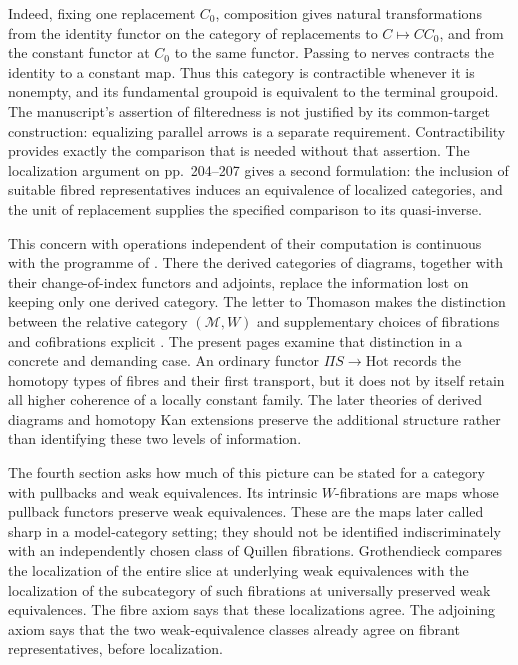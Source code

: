 Indeed, fixing one replacement $C_0$, composition gives natural transformations from the identity functor on the category of replacements to $C\mapsto C C_0$, and from the constant functor at $C_0$ to the same functor. Passing to nerves contracts the identity to a constant map. Thus this category is contractible whenever it is nonempty, and its fundamental groupoid is equivalent to the terminal groupoid. The manuscript's assertion of filteredness is not justified by its common-target construction: equalizing parallel arrows is a separate requirement. Contractibility provides exactly the comparison that is needed without that assertion. The localization argument on pp.~204--207 gives a second formulation: the inclusion of suitable fibred representatives induces an equivalence of localized categories, and the unit of replacement supplies the specified comparison to its quasi-inverse.

This concern with operations independent of their computation is continuous with the programme of \citet[\S69, printed pp.~1--3]{Grothendieck1983}. There the derived categories of diagrams, together with their change-of-index functors and adjoints, replace the information lost on keeping only one derived category. The letter to Thomason makes the distinction between the relative category $(\mathcal M,W)$ and supplementary choices of fibrations and cofibrations explicit \citep[points~1--2]{Grothendieck1991Letter}. The present pages examine that distinction in a concrete and demanding case. An ordinary functor $\Pi S\to\mathrm{Hot}$ records the homotopy types of fibres and their first transport, but it does not by itself retain all higher coherence of a locally constant family. The later theories of derived diagrams and homotopy Kan extensions preserve the additional structure rather than identifying these two levels of information.

The fourth section asks how much of this picture can be stated for a category with pullbacks and weak equivalences. Its intrinsic $W$-fibrations are maps whose pullback functors preserve weak equivalences. These are the maps later called sharp in a model-category setting; they should not be identified indiscriminately with an independently chosen class of Quillen fibrations. Grothendieck compares the localization of the entire slice at underlying weak equivalences with the localization of the subcategory of such fibrations at universally preserved weak equivalences. The fibre axiom says that these localizations agree. The adjoining axiom says that the two weak-equivalence classes already agree on fibrant representatives, before localization.

